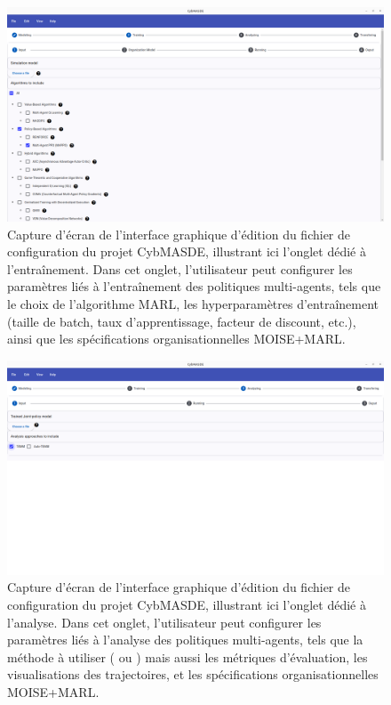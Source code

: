 \begin{figure}[h!]
       \centering
       \includegraphics[width=\linewidth]{figures/training_screenshot.png}
       \caption{Capture d'écran de l'interface graphique d'édition du fichier de configuration du projet CybMASDE, illustrant ici l'onglet dédié à l'entraînement. Dans cet onglet, l'utilisateur peut configurer les paramètres liés à l'entraînement des politiques multi-agents, tels que le choix de l'algorithme MARL, les hyperparamètres d'entraînement (taille de batch, taux d'apprentissage, facteur de discount, etc.), ainsi que les spécifications organisationnelles MOISE+MARL.}
       \label{fig:cybmasde_screenshot_training}
\end{figure}

\begin{figure}[h!]
       \centering
       \includegraphics[width=\linewidth]{figures/analyzing_screenshot.png}
       \caption{Capture d'écran de l'interface graphique d'édition du fichier de configuration du projet CybMASDE, illustrant ici l'onglet dédié à l'analyse. Dans cet onglet, l'utilisateur peut configurer les paramètres liés à l'analyse des politiques multi-agents, tels que la méthode à utiliser ( ou ) mais aussi les métriques d'évaluation, les visualisations des trajectoires, et les spécifications organisationnelles MOISE+MARL.}
       \label{fig:cybmasde_screenshot_analyzing}
\end{figure}

